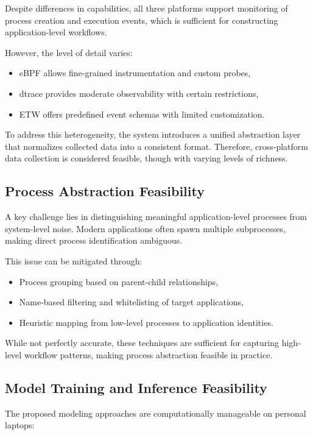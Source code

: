 \documentclass[11pt]{article}
\begin{document}
Despite differences in capabilities, all three platforms support monitoring of process creation and execution events, which is sufficient for constructing application-level workflows.

However, the level of detail varies:
\begin{itemize}
\item eBPF allows fine-grained instrumentation and custom probes,
\item dtrace provides moderate observability with certain restrictions,
\item ETW offers predefined event schemas with limited customization.
\end{itemize}

To address this heterogeneity, the system introduces a unified abstraction layer that normalizes collected data into a consistent format. Therefore, cross-platform data collection is considered feasible, though with varying levels of richness.

\subsection{Process Abstraction Feasibility}

A key challenge lies in distinguishing meaningful application-level processes from system-level noise. Modern applications often spawn multiple subprocesses, making direct process identification ambiguous.

This issue can be mitigated through:

\begin{itemize}
\item Process grouping based on parent-child relationships,
\item Name-based filtering and whitelisting of target applications,
\item Heuristic mapping from low-level processes to application identities.
\end{itemize}

While not perfectly accurate, these techniques are sufficient for capturing high-level workflow patterns, making process abstraction feasible in practice.

\subsection{Model Training and Inference Feasibility}

The proposed modeling approaches are computationally manageable on personal laptops:
\end{document}
